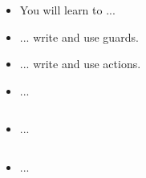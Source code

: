 \begin{frame}
\begin{itemize}
\item You will learn to ...
\item ... write and use guards.
\item ... write and use actions.
\end{itemize}
\end{frame}




\begin{frame}[fragile=singleslide]
\begin{itemize}
\item ...
\end{itemize}
\begin{lstlisting}

\end{lstlisting}
\end{frame}





\begin{frame}[fragile=singleslide=singleslide]
\begin{itemize}
\item ...
\end{itemize}
\begin{lstlisting}

\end{lstlisting}
\end{frame}





\begin{frame}[fragile=singleslide]
\begin{itemize}
\item ...
\end{itemize}
\begin{lstlisting}

\end{lstlisting}
\end{frame}





